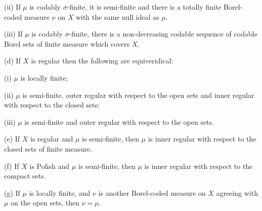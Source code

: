 \quad(ii) If $\mu$ is codably $\sigma$-finite, it is semi-finite and
there is a totally finite
Borel-coded measure $\nu$ on $X$ with the same null ideal as $\mu$.

\quad(iii) If $\mu$ is codably $\sigma$-finite, there is a non-decreasing
codable sequence of codable Borel sets of finite measure which covers $X$.

(d) If $X$ is regular then the following are equiveridical:

\quad(i) $\mu$ is locally finite;

\quad(ii) $\mu$ is semi-finite,
outer regular with respect to the open sets and inner regular with
respect to the closed sets;

\quad(iii) $\mu$ is semi-finite
and outer regular with respect to the open sets.

(e) If $X$ is regular and $\mu$ is semi-finite, then $\mu$
is inner regular with
respect to the closed sets of finite measure.

(f) If $X$ is Polish and $\mu$ is semi-finite, then $\mu$ is
inner regular with respect to the compact sets.

(g) If $\mu$ is locally finite, and $\nu$ is another Borel-coded measure on
$X$ agreeing with $\mu$ on the open sets, then $\nu=\mu$.

